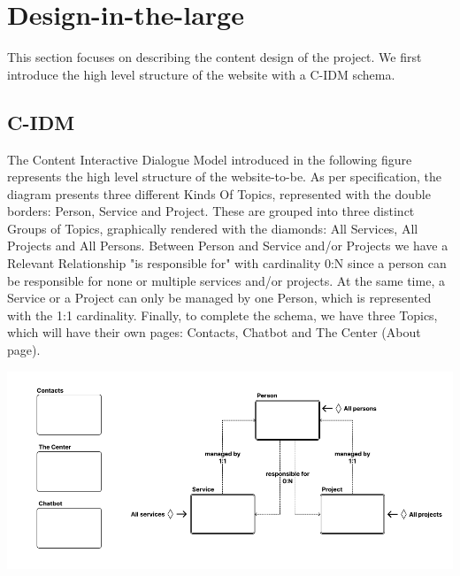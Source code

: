 



\section{Design-in-the-large}
This section focuses on describing the content design of the project. We first introduce the high level structure of the website with a C-IDM schema.

\subsection{C-IDM}
The Content Interactive Dialogue Model introduced in the following figure represents the high level structure of the website-to-be.
As per specification, the diagram presents three different Kinds Of Topics, represented with the double borders: Person, Service and Project.
These are grouped into three distinct Groups of Topics, graphically rendered with the diamonds: All Services, All Projects and All Persons.
Between Person and Service and/or Projects we have a Relevant Relationship "is responsible for" with cardinality 0:N since a person can be responsible
for none or multiple services and/or projects. At the same time, a Service or a Project can only be managed by one Person, which is represented with the 1:1 cardinality.
Finally, to complete the schema, we have three Topics, which will have their own pages: Contacts, Chatbot and The Center (About page).

\includegraphics[width=1\linewidth]{img/design-document/C-IDM.png}

